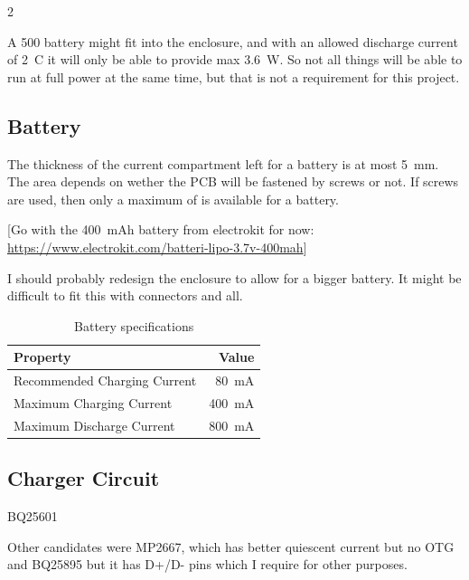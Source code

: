 \documentclass[11px]{specification}
\begin{document}
\begin{multicols}{2}

A \qty{500}{\mAh} battery might fit into the enclosure, and with an allowed discharge current of \qty{2}{C} it will only be able to provide max \qty{3.6}{\watt}. So not all things will be able to run at full power at the same time, but that is not a requirement for this project.

\subsection{Battery}
The thickness of the current compartment left for a battery is at most \qty{5}{\milli\meter}. The area depends on wether the PCB will be fastened by screws or not. If screws are used, then only a maximum of  is available for a battery.

[Go with the \qty{400}{mAh} battery from electrokit for now: \url{https://www.electrokit.com/batteri-lipo-3.7v-400mah}]

I should probably redesign the enclosure to allow for a bigger battery. It might be difficult to fit this with connectors and all.

\begin{table}[H]
    \centering
    \begin{tabular}{|l|r|}
        \hline
        \textbf{Property}            & \textbf{Value}           \\
        \hline
        Recommended Charging Current & \qty{80}{\milli\ampere}  \\
        Maximum Charging Current     & \qty{400}{\milli\ampere} \\
        Maximum Discharge Current    & \qty{800}{\milli\ampere} \\
        \hline
    \end{tabular}
    \caption{Battery specifications}
    \label{tab:battery-specs}
\end{table}

\subsection{Charger Circuit}
BQ25601

Other candidates were MP2667, which has better quiescent current but no OTG and BQ25895 but it has D+/D- pins which I require for other purposes.



\end{multicols}
\end{document}

